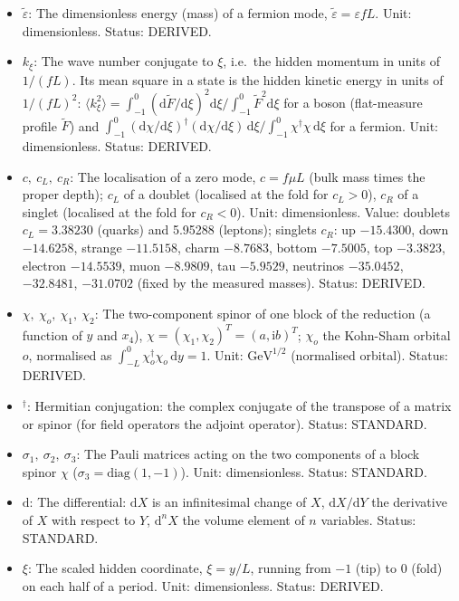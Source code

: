 \documentclass[
  10pt,
]{article}
\providecommand{\tightlist}{%
  \setlength{\itemsep}{0pt}\setlength{\parskip}{0pt}}
\begin{document}
\begin{itemize}
\tightlist
\item
  \(\tilde\varepsilon\): The dimensionless energy (mass) of a fermion
  mode, \(\tilde\varepsilon = \varepsilon fL\). Unit: dimensionless.
  Status: DERIVED.
\item
  \(k_\xi\): The wave number conjugate to \(\xi\), i.e.~the hidden
  momentum in units of \(1/(fL)\). Its mean square in a state is the
  hidden kinetic energy in units of \(1/(fL)^2\):
  \(\langle k_\xi^2\rangle = \int_{-1}^{0}(\mathrm{d}\tilde F/\mathrm{d}\xi)^2\mathrm{d}\xi\big/\int_{-1}^{0}\tilde F^2\mathrm{d}\xi\)
  for a boson (flat-measure profile \(\tilde F\)) and
  \(\int_{-1}^{0}(\mathrm{d}\chi/\mathrm{d}\xi)^\dagger(\mathrm{d}\chi/\mathrm{d}\xi)\,\mathrm{d}\xi\big/\int_{-1}^{0}\chi^\dagger\chi\,\mathrm{d}\xi\)
  for a fermion. Unit: dimensionless. Status: DERIVED.
\item
  \(c,\ c_L,\ c_R\): The localisation of a zero mode, \(c = f\mu L\)
  (bulk mass times the proper depth); \(c_L\) of a doublet (localised at
  the fold for \(c_L > 0\)), \(c_R\) of a singlet (localised at the fold
  for \(c_R < 0\)). Unit: dimensionless. Value: doublets
  \(c_L = 3.38230\) (quarks) and 5.95288 (leptons); singlets \(c_R\): up
  \(-15.4300\), down \(-14.6258\), strange \(-11.5158\), charm
  \(-8.7683\), bottom \(-7.5005\), top \(-3.3823\), electron
  \(-14.5539\), muon \(-8.9809\), tau \(-5.9529\), neutrinos
  \(-35.0452\), \(-32.8481\), \(-31.0702\) (fixed by the measured
  masses). Status: DERIVED.
\item
  \(\chi,\ \chi_o,\ \chi_1,\ \chi_2\): The two-component spinor of one
  block of the reduction (a function of \(y\) and \(x_4\)),
  \(\chi = (\chi_1, \chi_2)^T = (a, \mathrm{i}b)^T\); \(\chi_o\) the
  Kohn-Sham orbital \(o\), normalised as
  \(\int_{-L}^{0}\chi_o^\dagger\chi_o\,\mathrm{d}y = 1\). Unit:
  \(\mathrm{GeV}^{1/2}\) (normalised orbital). Status: DERIVED.
\item
  \({}^\dagger\): Hermitian conjugation: the complex conjugate of the
  transpose of a matrix or spinor (for field operators the adjoint
  operator). Status: STANDARD.
\item
  \(\sigma_1,\ \sigma_2,\ \sigma_3\): The Pauli matrices acting on the
  two components of a block spinor \(\chi\)
  (\(\sigma_3 = \mathrm{diag}(1, -1)\)). Unit: dimensionless. Status:
  STANDARD.
\item
  \(\mathrm{d}\): The differential: \(\mathrm{d}X\) is an infinitesimal
  change of \(X\), \(\mathrm{d}X/\mathrm{d}Y\) the derivative of \(X\)
  with respect to \(Y\), \(\mathrm{d}^nX\) the volume element of \(n\)
  variables. Status: STANDARD.
\item
  \(\xi\): The scaled hidden coordinate, \(\xi = y/L\), running from
  \(-1\) (tip) to \(0\) (fold) on each half of a period. Unit:
  dimensionless. Status: DERIVED.
\end{itemize}
\end{document}
